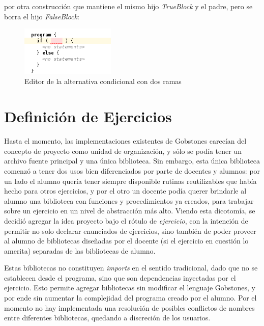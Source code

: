 \centertree{
  [IfElseStatement
    [TrueBlock]
    [FalseBlock]
  ]
} 

\noindent por otra construcción que mantiene el mismo hijo \textit{TrueBlock} y el padre, pero se borra el hijo \textit{FalseBlock}:

\centertree{
  [IfElseStatement
    [TrueBlock]
    [empty]
  ]
}


  \begin{figure}[h]
  \centering
  \includegraphics[width=0.40\textwidth]{assets/if-statement}
  \caption{Editor de la alternativa condicional con dos ramas}
  \label{fig:if-statement}
  \end{figure}


\section{Definición de Ejercicios}\label{proyecto}

Hasta el momento, las implementaciones existentes de Gobstones carecían del concepto de proyecto como unidad de organización, y sólo se podía tener un archivo fuente principal y una única biblioteca. Sin embargo, esta única biblioteca comenzó a tener dos usos bien diferenciados por parte de docentes y alumnos: por un lado el alumno quería tener siempre disponible rutinas reutilizables que había hecho para otros ejercicios, y por el otro un docente podía querer brindarle al alumno una biblioteca con funciones y procedimientos ya creados, para trabajar sobre un ejercicio en un nivel de abstracción más alto.
Viendo esta dicotomía, se decidió agregar la idea proyecto bajo el rótulo de \emph{ejercicio}, con la intención de permitir no solo declarar enunciados de ejercicios, sino también de poder proveer al alumno de bibliotecas diseñadas por el docente (si el ejercicio en cuestión lo amerita) separadas de las bibliotecas de alumno.

Estas bibliotecas no constituyen \textit{imports} en el sentido tradicional, dado que no se establecen desde el programa, sino que son dependencias inyectadas por el ejercicio. Esto permite agregar bibliotecas sin modificar el lenguaje Gobstones, y por ende sin aumentar la complejidad del programa creado por el alumno. Por el momento no hay implementada una resolución de posibles conflictos de nombres entre diferentes bibliotecas, quedando a discreción de los usuarios.

